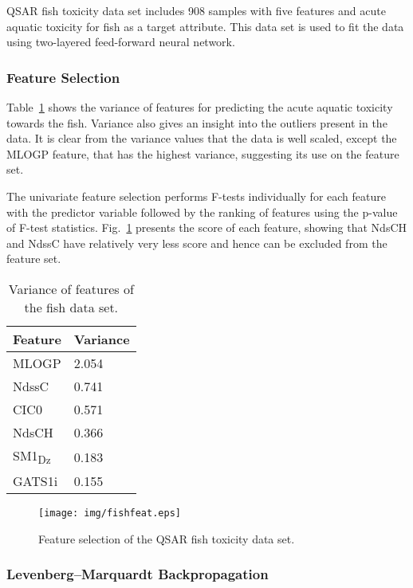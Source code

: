QSAR fish toxicity data set includes 908 samples with five features and acute aquatic toxicity for fish as a target attribute. This data set is used to fit the data using two-layered feed-forward neural network.

\subsubsection{Feature Selection}

Table~\ref{tab:fishvar} shows the variance of features for predicting the acute aquatic toxicity towards the fish. Variance also gives an insight into the outliers present in the data. It is clear from the variance values that the data is well scaled, except the MLOGP feature, that has the highest variance, suggesting its use on the feature set.

The univariate feature selection performs F-tests individually for each feature with the predictor variable followed by the ranking of features using the p-value of F-test statistics. Fig.~\ref{fig:fishfeat} presents the score of each feature, showing that NdsCH and NdssC have relatively very less score and hence can be excluded from the feature set.

\begin{table}[htbp]
    \centering
    \caption{Variance of features of the fish data set.}
    \label{tab:fishvar}
    \begin{tabular}{|l|l|}
    \hline
    \textbf{Feature} & \textbf{Variance}\\ \hline
    MLOGP& 2.054\\ \hline
    NdssC & 0.741\\ \hline
    CIC0 & 0.571 \\ \hline 
    NdsCH & 0.366\\ \hline
    SM1\textsubscript{Dz} & 0.183\\ \hline
    GATS1i & 0.155\\ \hline
\end{tabular}
    
\end{table}

\begin{figure}[htbp]
  \centering
\texttt{[image: img/fishfeat.eps]}
  \caption{Feature selection of the QSAR fish toxicity data set.}
  \label{fig:fishfeat}
\end{figure}

\subsubsection{Levenberg--Marquardt Backpropagation}

